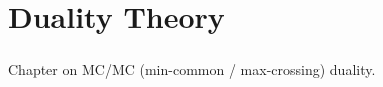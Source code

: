 \chapter{Duality Theory}
\label{chap:03}
\paragraph{}Chapter on MC/MC (min-common / max-crossing) duality.


% 
% 

